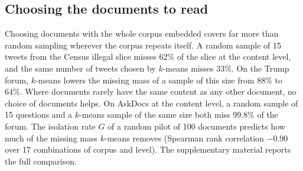 \subsection{Choosing the documents to read}
\label{sec:design-results}

Choosing documents with the whole corpus embedded covers far more than random sampling wherever the corpus repeats itself. A random sample of 15 tweets from the Census illegal slice misses 62\% of the slice at the content level, and the same number of tweets chosen by $k$-means misses 33\%. On the Trump forum, $k$-means lowers the missing mass of a sample of this size from 88\% to 64\%. Where documents rarely have the same content as any other document, no choice of documents helps. On AskDocs at the content level, a random sample of 15 questions and a $k$-means sample of the same size both miss 99.8\% of the forum. The isolation rate $G$ of a random pilot of 100 documents predicts how much of the missing mass $k$-means removes (Spearman rank correlation $-0.90$ over 17 combinations of corpus and level). The supplementary material reports the full comparison.
